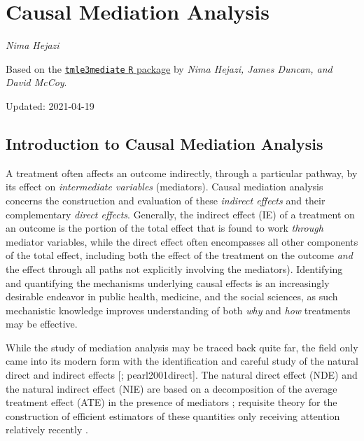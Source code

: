 \documentclass[12pt, krantz2,]{krantz}
\theoremstyle{definition}
\theoremstyle{definition}
\theoremstyle{definition}
\newcommand{\1}{\mathbbm{1}}
\begin{document}
\hypertarget{causal-mediation-analysis}{%
\section{Causal Mediation Analysis}\label{causal-mediation-analysis}}

\emph{Nima Hejazi}

Based on the \href{https://github.com/tlverse/tmle3mediate}{\texttt{tmle3mediate} \texttt{R}
package} by \emph{Nima Hejazi, James
Duncan, and David McCoy}.

Updated: 2021-04-19

\hypertarget{introduction-to-causal-mediation-analysis}{%
\subsection{Introduction to Causal Mediation Analysis}\label{introduction-to-causal-mediation-analysis}}

A treatment often affects an outcome indirectly, through a particular pathway,
by its effect on \emph{intermediate variables} (mediators). Causal mediation analysis
concerns the construction and evaluation of these \emph{indirect effects} and their
complementary \emph{direct effects}. Generally, the indirect effect (IE) of a
treatment on an outcome is the portion of the total effect that is found to work
\emph{through} mediator variables, while the direct effect often encompasses all
other components of the total effect, including both the effect of the treatment
on the outcome \emph{and} the effect through all paths not explicitly involving the
mediators). Identifying and quantifying the mechanisms underlying causal effects
is an increasingly desirable endeavor in public health, medicine, and the social
sciences, as such mechanistic knowledge improves understanding of both \emph{why} and
\emph{how} treatments may be effective.

While the study of mediation analysis may be traced back quite far, the field
only came into its modern form with the identification and careful study of the
natural direct and indirect effects {[}\citet{robins1992identifiability};
pearl2001direct{]}. The natural direct effect (NDE) and the natural indirect
effect (NIE) are based on a decomposition of the average treatment effect (ATE)
in the presence of mediators \citep{vanderweele2015explanation}; requisite
theory for the construction of efficient estimators of these quantities only
receiving attention relatively recently \citep{tchetgen2012semiparametric}.
\end{document}
